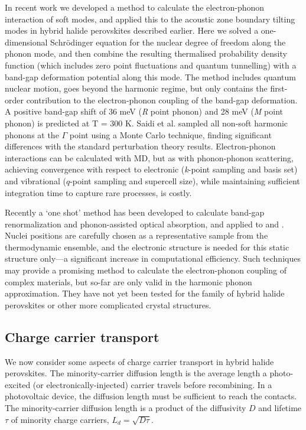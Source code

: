 In recent work\autocite{Whalley2016} we developed a method to calculate the electron-phonon interaction of soft modes, and applied this to the acoustic zone boundary tilting modes in hybrid halide perovskites described earlier. 
Here we solved a one-dimensional Schr\"odinger equation for the nuclear degree of freedom along the phonon mode, and then combine the resulting thermalised probability density function (which includes zero point fluctuations and quantum tunnelling) with a band-gap deformation potential along this mode. 
The method includes quantum nuclear motion, goes beyond the harmonic regime, but only contains the first-order contribution to the electron-phonon coupling of the band-gap deformation. 
A positive band-gap shift of 36 meV (\textit{R} point phonon) and 28 meV (\textit{M} point phonon) 
is predicted at T = 300 K.
%
Saidi et al. sampled all non-soft harmonic phonons at the $\Gamma$ point using a Monte Carlo technique,\autocite{Saidi2016} finding significant differences with the standard perturbation theory results.
%
Electron-phonon interactions can be calculated with MD, but as with phonon-phonon scattering, 
achieving convergence with respect to electronic (\textit{k}-point sampling and basis set) 
and vibrational ($q$-point sampling and supercell size), while maintaining sufficient integration time to capture rare processes, is costly.

Recently a `one shot' method has been developed to calculate band-gap renormalization and phonon-assisted optical absorption, and applied to  and .\autocite{Zacharias2016} 
Nuclei positions are carefully chosen as a representative sample from the thermodynamic ensemble, and the electronic structure is needed for this static structure only---a significant increase in computational efficiency. 
Such techniques may provide a promising method to calculate the electron-phonon coupling of complex materials, but so-far are only valid in the harmonic phonon approximation. 
They have not yet been tested for the family of hybrid halide perovskites or other more complicated crystal structures.

\subsection{Charge carrier transport}

We now consider some aspects of charge carrier transport in hybrid halide perovskites.
The minority-carrier diffusion length is the average length a photo-excited (or electronically-injected) carrier travels before recombining. 
In a photovoltaic device, the diffusion length must be sufficient to reach the contacts.
The minority-carrier diffusion length is a product of the diffusivity $D$ and lifetime $\tau$ of minority charge carriers, $L_d = \sqrt{D\tau}$.

